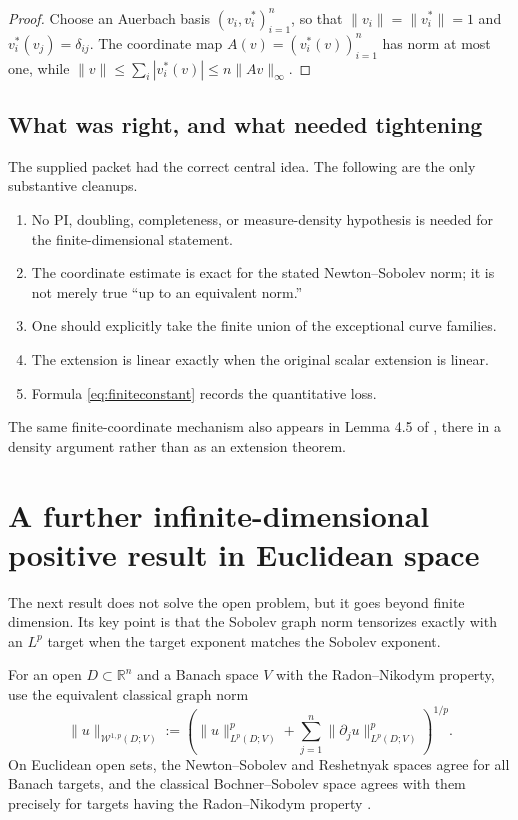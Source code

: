 \documentclass[11pt]{article}
\theoremstyle{remark}
\newcommand{\R}{\mathbb{R}}
\newcommand{\Lp}{L^p}
\newcommand{\Wgraph}{\mathcal{W}^{1,p}}
\begin{document}
\begin{proof}
Choose an Auerbach basis $(v_i,v_i^*)_{i=1}^n$, so that
$\|v_i\|=\|v_i^*\|=1$ and $v_i^*(v_j)=\delta_{ij}$.  The coordinate map
$A(v)=(v_i^*(v))_{i=1}^n$ has norm at most one, while
$\|v\|\le\sum_i|v_i^*(v)|\le n\|Av\|_\infty$.
\end{proof}

\subsection*{What was right, and what needed tightening}

The supplied packet had the correct central idea.  The following are the
only substantive cleanups.
\begin{enumerate}[leftmargin=2em,itemsep=3pt]
  \item No PI, doubling, completeness, or measure-density hypothesis is
  needed for the finite-dimensional statement.
  \item The coordinate estimate is exact for the stated Newton--Sobolev
  norm; it is not merely true ``up to an equivalent norm.''
  \item One should explicitly take the finite union of the exceptional
  curve families.
  \item The extension is linear exactly when the original scalar extension
  is linear.
  \item Formula \eqref{eq:finiteconstant} records the quantitative loss.
\end{enumerate}
The same finite-coordinate mechanism also appears in Lemma 4.5 of
\cite{GBIZ23}, there in a density argument rather than as an extension
theorem.

\section{A further infinite-dimensional positive result in Euclidean space}

The next result does not solve the open problem, but it goes beyond finite
dimension.  Its key point is that the Sobolev graph norm tensorizes exactly
with an $L^p$ target when the target exponent matches the Sobolev exponent.

For an open $D\subset\R^n$ and a Banach space $V$ with the Radon--Nikodym
property, use the equivalent classical graph norm
\begin{equation}
\label{eq:graphnorm}
  \|u\|_{\Wgraph(D;V)}
  :=\left(
       \|u\|_{\Lp(D;V)}^p+
       \sum_{j=1}^n\|\partial_j u\|_{\Lp(D;V)}^p
     \right)^{1/p}.
\end{equation}
On Euclidean open sets, the Newton--Sobolev and Reshetnyak spaces agree for
all Banach targets, and the classical Bochner--Sobolev space agrees with
them precisely for targets having the Radon--Nikodym property
\cite{CaamanoEtAl}.
\end{document}
